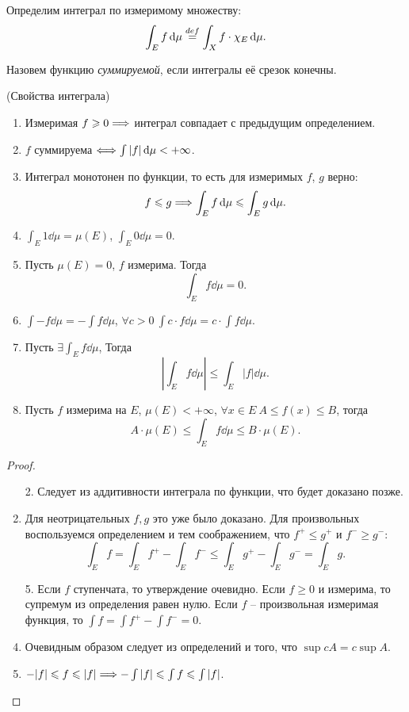 \begin{definition}
	Определим интеграл по измеримому множеству:
\[
	\int_E{f \,\mathrm{d}\mu} \overset{def}{\underset{}{=}} \int_X{f \cdot \chi_{E} \,\mathrm{d}\mu}
.\]
\end{definition}

\begin{definition}
	Назовем функцию \textit{суммируемой}, если интегралы её срезок конечны.
\end{definition}

\begin{theorem}(Свойства интеграла)
	\enewline
	\begin{enumerate}
		\item Измеримая $f \geqslant 0 \Longrightarrow$ интеграл совпадает с предыдущим определением.
		\item $f$ суммируема $\Longleftrightarrow \int{|f| \,\mathrm{d}\mu} < +\infty$. 
        \item Интеграл монотонен по функции, то есть для измеримых $f$, $g$ верно:
\[
    f \leqslant g \Longrightarrow \int_{E}{f \,\mathrm{d}\mu} \leqslant \int_{E}{g \,\mathrm{d}\mu}
.\] 
        \item $\displaystyle \int_E{1 \dd\mu} = \mu(E)$, $\displaystyle \int_E{0 \dd\mu} = 0$.
        \item Пусть $\mu(E) = 0$, $f$ измерима. Тогда
\[
    \int_E{f \dd\mu} = 0
.\] 
        \item $\displaystyle \int{-f \dd\mu} = -\int{f \dd\mu}$, $\displaystyle 
               \forall c > 0~ \int{c \cdot f \dd\mu} = c \cdot \int{f \dd\mu}$.
        \item Пусть $\displaystyle \exists \int_E{f \dd\mu}$, Тогда
\[
    \left|{\int_E{f \dd\mu}}\right| \leqslant {\int_E{|f| \dd\mu}}
.\] 
        \item Пусть $f$ измерима на $E$, $\mu(E) < +\infty$, 
            $\forall x \in E~ A \leqslant f(x) \leqslant B$,
            тогда
\[
    A \cdot \mu(E) \leqslant \int_E{f \dd\mu} \leqslant B \cdot \mu(E)
.\] 
	\end{enumerate}
\end{theorem}
\begin{proof}
    \enewline
	\begin{enumerate}
        \item[2.] Следует из аддитивности интеграла по функции, что будет доказано позже.
        \item Для неотрицательных $f, g$ это уже было доказано. Для произвольных воспользуемся
            определением и тем соображением, что $f^+ \leqslant g^+$ и $f^- \geqslant g^-$:
\[
    \int_E{f} = \int_E{f^+} - \int_E{f^-} \leqslant \int_E{g^+} - \int_E{g^-} = \int_E{g}
.\]
        \item[5.] Если $f$ ступенчата, то утверждение очевидно. Если $f \geqslant 0$ и измерима,
            то супремум из определения равен нулю. Если $f$ -- произвольная измеримая функция,
            то  $\int{f} = \int{f^+} - \int{f^-} = 0$.
        \item Очевидным образом следует из определений и того, что $\sup{c A} = c \sup{A}$.
        \item $-|f| \leqslant f \leqslant |f| \Longrightarrow -\int{|f|} \leqslant \int{f} \leqslant \int{|f|}$.
	\end{enumerate}
\end{proof}


